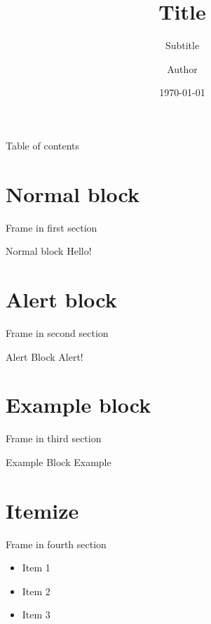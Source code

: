 \documentclass[xetex,aspectratio=169]{beamer}
\title
    {Title}
\subtitle
    {Subtitle}
\author
    {Author}
\date{\today}
\begin{document}
    
    
    \begin{frame}
        \titlepage
    \end{frame}
    

    {
    \begin{frame}{Table of contents}
        \tableofcontents
    \end{frame}
    }
    
    \section{Normal block}
    \begin{frame}{Frame in first section}
        \begin{block}{Normal block}
            Hello!        
        \end{block}

    \end{frame}
    
    \section{Alert block}
    \begin{frame}{Frame in second section}
        \begin{alertblock}{Alert Block}
            Alert!
        \end{alertblock}
    \end{frame}

    \section{Example block}
    \begin{frame}{Frame in third section}
        \begin{exampleblock}{Example Block}
            Example
        \end{exampleblock}
    \end{frame}

    \section{Itemize}
    \begin{frame}{Frame in fourth section}
        \begin{itemize}
            \item Item 1
            \item Item 2
            \item Item 3
        \end{itemize}
    \end{frame}
\end{document}
